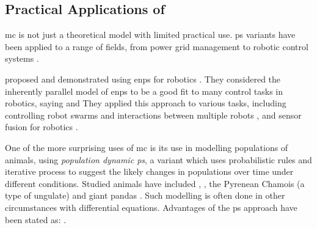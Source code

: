 
\subsection{\label{sec:psystemsuses}Practical Applications of }
\Gls{mc} is not just a theoretical model with limited practical use.  \Gls{ps} variants have been applied to a range of fields, from power grid management to robotic control systems \cite{Zhang2017}.

\citeauthor{Florea2017} proposed and demonstrated using \gls{enps} for robotics \cite{Florea2017,Florea2016,Florea2017a,Florea2019,Florea2016a,Florea2018}.  They considered the inherently parallel model of \gls{enps} to be a good fit to many control tasks in robotics, saying  and   They applied this approach to various tasks, including controlling robot swarms \cite{Florea2016} and interactions between multiple robots \cite{Florea2017}, and sensor fusion for robotics \cite{Florea2019}.

One of the more surprising uses of \gls{mc} is its use in modelling populations of animals, using \emph{population dynamic \gls{ps}}, a variant which uses probabilistic rules and iterative process to suggest the likely changes in populations over time under different conditions.  Studied animals have included , , the Pyrenean Chamois (a type of ungulate) \cite{Colomer2010} and giant pandas \cite{Duan2020}.  Such modelling is often done in other circumstances with differential equations.  Advantages of the \gls{ps} approach have been stated as: .

